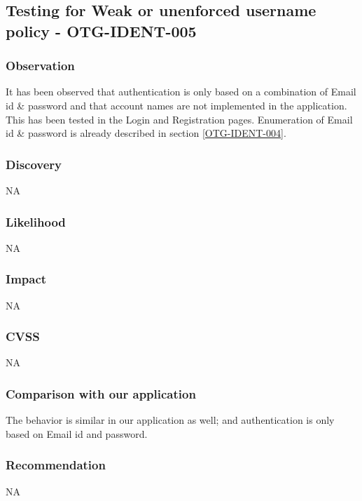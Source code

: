 \subsection{Testing for Weak or unenforced username policy - OTG-IDENT-005}

\subsubsection{Observation}
It has been observed that authentication is only based on a combination of Email id \& password and that account names are not implemented in the application. This has been tested in the Login and Registration pages. 
Enumeration of Email id \& password is already described in section \ref{OTG-IDENT-004}.

\subsubsection{Discovery}
NA

\subsubsection{Likelihood}
NA

\subsubsection{Impact}
NA

\subsubsection{CVSS}
NA

\subsubsection{Comparison with our application}
The behavior is similar in our application as well; and authentication is only based on Email id and password.

\subsubsection{Recommendation}
NA

\clearpage